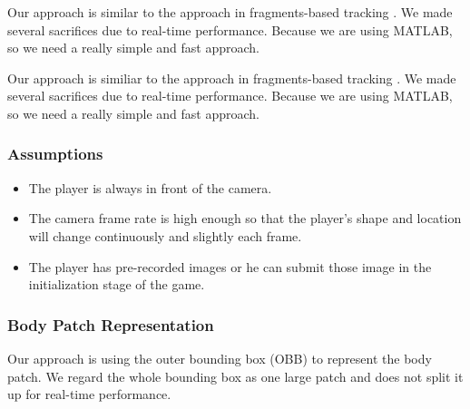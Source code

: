 \documentclass[11pt,twocolumn,letterpaper]{article}
\begin{document}
Our approach is similar to the approach in fragments-based tracking  \cite{1640835}. We made several sacrifices due to real-time performance. Because  we are using MATLAB, so we need a really simple and fast approach. 

Our approach is similiar to the approach in fragments-based tracking  \cite{1640835}. We made several sacrifices due to real-time performance. Because  we are using MATLAB, so we need a really simple and fast approach. 

\par
\subsubsection*{Assumptions}
\begin{itemize}
\item The player is always in front of the camera.
\item The camera frame rate is high enough so that the player's shape and location will change continuously and slightly each frame.
\item The player has pre-recorded images or he can submit those image in the initialization stage of the game.
\end{itemize}
\subsubsection*{Body Patch Representation}
\par
Our approach is using the outer bounding box (OBB) to represent the body patch. We regard the whole bounding box as one large patch and does not split it up for real-time performance.
\end{document}
